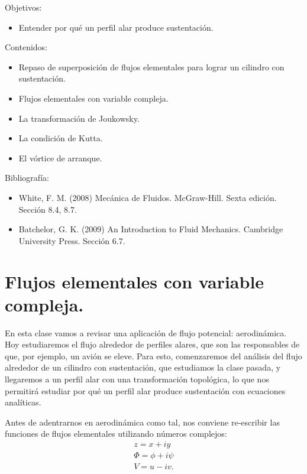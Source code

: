 \begin{framed}

Objetivos:
\begin{itemize}
    \item Entender por qué un perfil alar produce sustentación. 
\end{itemize}

Contenidos:
\begin{itemize}
    \item Repaso de superposición de flujos elementales para lograr un cilindro con sustentación.
    \item Flujos elementales con variable compleja. 
    \item La transformación de Joukowsky.
    \item La condición de Kutta.
    \item El vórtice de arranque.
\end{itemize}

Bibliografía:
\begin{itemize}
    \item White, F. M. (2008) Mecánica de Fluidos. McGraw-Hill. Sexta edición. Sección 8.4, 8.7.
    \item Batchelor, G. K. (2009) An Introduction to Fluid Mechanics. Cambridge University Press. Sección 6.7.
\end{itemize}
\end{framed}

\section*{Flujos elementales con variable compleja.}

En esta clase vamos a revisar una aplicación de flujo potencial: aerodinámica.
Hoy estudiaremos el flujo alrededor de perfiles alares, que son las responsables de que, por ejemplo, un avión se eleve.
Para esto, comenzaremos del análisis del flujo alrededor de un cilindro con sustentación, que estudiamos la clase pasada, y llegaremos a un perfil alar con una transformación topológica, lo que nos permitirá estudiar por qué un perfil alar produce sustentación con ecuaciones analíticas.

Antes de adentrarnos en aerodinámica como tal, nos conviene re-escribir las funciones de flujos elementales utilizando números complejos:
%
\begin{align}\label{eq:z_complejo}
z = x+iy\nonumber\\
\Phi = \phi + i\psi\nonumber\\
V = u-iv.
\end{align}

